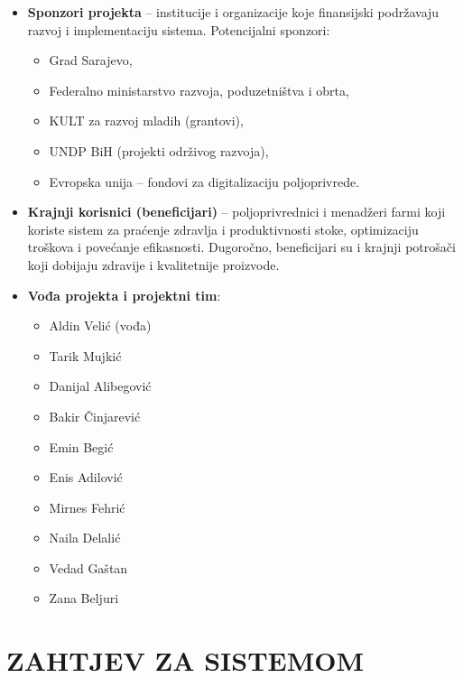 \documentclass{article}
\begin{document}
\begin{itemize}
 \item \textbf{Sponzori projekta} – institucije i organizacije koje finansijski podržavaju razvoj i implementaciju sistema. Potencijalni sponzori:
 \begin{itemize}
 \item Grad Sarajevo,
 \item Federalno ministarstvo razvoja, poduzetništva i obrta,
 \item KULT za razvoj mladih (grantovi),
 \item UNDP BiH (projekti održivog razvoja),
 \item Evropska unija – fondovi za digitalizaciju poljoprivrede.
 \end{itemize}

 \item \textbf{Krajnji korisnici (beneficijari)} – poljoprivrednici i menadžeri farmi koji koriste sistem za praćenje zdravlja i produktivnosti stoke, optimizaciju troškova i povećanje efikasnosti. Dugoročno, beneficijari su i krajnji potrošači koji dobijaju zdravije i kvalitetnije proizvode.

\item \textbf{Vođa projekta i projektni tim}:\begin{itemize}
 \item Aldin Velić (vođa)
 \item Tarik Mujkić
 \item Danijal Alibegović
 \item Bakir Činjarević
 \item Emin Begić
 \item Enis Adilović
\item Mirnes Fehrić
 \item Naila Delalić
 \item Vedad Gaštan
 \item Zana Beljuri
 \end{itemize}
\end{itemize}

\newpage
\section{ZAHTJEV ZA SISTEMOM} %
\end{document}
